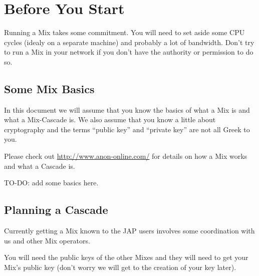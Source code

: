 \documentclass{article}
\begin{document}



\section{Before You Start}

Running a Mix takes some commitment. You will need to set aside some
CPU cycles (idealy on a separate machine) and probably a lot of
bandwidth. Don't try to run a Mix in your network if you don't have
the authority or permission to do so. 


\subsection{Some Mix Basics}

In this document we will assume that you know the basics of what a Mix
is and what a Mix-Cascade is. We also assume that you know a little
about cryptography and the terms ``public key'' and ``private key''
are not all Greek to you.

Please check out \url{http://www.anon-online.com/} for details on how
a Mix works and what a Cascade is.

TO-DO: add some basics here.


\subsection{Planning a Cascade}

Currently getting a Mix known to the JAP users involves some
coordination with us and other Mix operators.

You will need the public keys of the other Mixes and they will need to
get your Mix's public key (don't worry we will get to the creation of
your key later).
\end{document}
